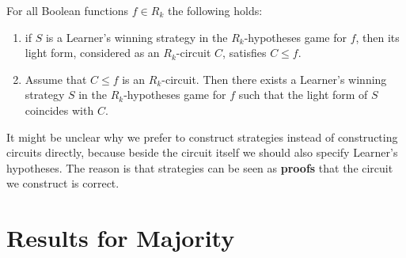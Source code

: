 \documentclass{toc}
\begin{document}
\begin{proposition}
\label{R_k_equivalence}
For all Boolean functions $f\in R_k$ the following holds:
\begin{enumerate}[label=(\alph*)]
\item if $S$ is a Learner's winning strategy in the $R_k$-hypotheses game for $f$, then its light form, considered as an $R_k$-circuit $C$, satisfies $C\le f$.


\item  Assume that $C\le f$ is an $R_k$-circuit. Then there exists a Learner's winning strategy $S$ in the $R_k$-hypotheses game for $f$ such that the light form of $S$ coincides with $C$.
\end{enumerate}
\end{proposition}
\begin{remark}
It might be unclear why we prefer to construct strategies instead of constructing circuits directly, because beside the circuit itself we should also specify Learner's hypotheses. The reason is that strategies can be seen as \textbf{proofs} that the circuit we construct is correct.
\end{remark}





















\section{Results for Majority} \label{sec:majority}
\end{document}
